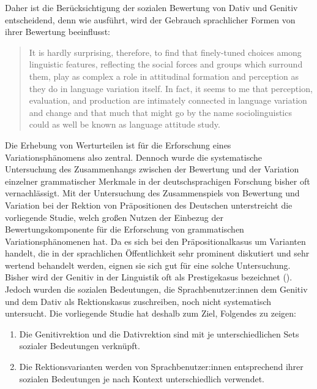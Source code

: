 Daher ist die Berücksichtigung der sozialen Bewertung von Dativ und Genitiv entscheidend, denn wie \citet[45]{Preston2004} ausführt, wird der Gebrauch sprachlicher Formen von ihrer Bewertung beeinflusst: 
\begin{quote}It is hardly surprising, therefore, to find that finely-tuned choices among linguistic features, reflecting the social forces and groups which surround them, play as complex a role in attitudinal formation and perception as they do in language variation itself. In fact, it seems to me that perception, evaluation, and production are intimately connected in language variation and change and that much that might go by the name \glqq sociolinguistics\grqq{} could as well be known as \glqq language attitude study\grqq.~\citep[45]{Preston2004}\end{quote}
Die Erhebung von Werturteilen ist für die Erforschung eines Variationsphänomens also zentral. 
Dennoch wurde die systematische Untersuchung des Zusammenhangs zwischen der Bewertung und der Variation einzelner grammatischer Merkmale in der deutschsprachigen Forschung bisher oft vernachlässigt. %
Mit der Untersuchung des Zusammenspiels von Bewertung und Variation bei der Rektion von Präpositionen des Deutschen unterstreicht die vorliegende Studie, welch großen Nutzen der Einbezug der Bewertungskomponente für die Erforschung von grammatischen Variationsphänomenen hat. %
Da es sich bei den Präpositionalkasus um Varianten handelt, die in der sprachlichen Öffentlichkeit sehr prominent diskutiert und sehr wertend behandelt werden, eignen sie sich gut für eine solche Untersuchung.  
Bisher wird der Genitiv in der Linguistik oft als \glqq Prestigekasus\grqq{} bezeichnet (\cites[s. etwa][36]{Lehmann1992}[6]{Zimmer.2018}). 
Jedoch wurden die sozialen Bedeutungen, die Sprachbenutzer:innen dem Genitiv und dem Dativ als Rektionskasus zuschreiben, noch nicht systematisch untersucht. 
Die vorliegende Studie hat deshalb zum Ziel, Folgendes zu zeigen: 
\begin{enumerate}
\item Die Genitivrektion und die Dativrektion sind mit je unterschiedlichen Sets sozialer Bedeutungen verknüpft. 
\item Die Rektionsvarianten werden von Sprachbenutzer:innen entsprechend ihrer sozialen Bedeutungen je nach Kontext unterschiedlich verwendet. 
\end{enumerate}

